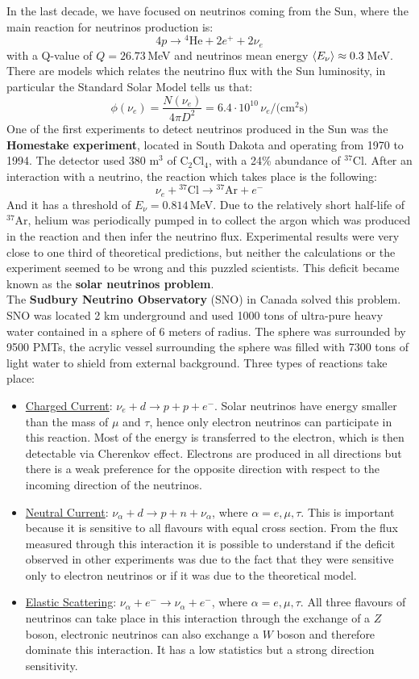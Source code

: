 \documentclass[10.75pt,a4paper,openright,bottom=2cm]{article}
\begin{document}
In the last decade, we have focused on neutrinos coming from the Sun, where the main reaction for neutrinos production is:
\[
4p\to\text{$^4$He}+2e^++2\nu_e
\]
with a Q-value of $Q=26.73$\,MeV and neutrinos mean energy $\Braket{E_\nu}\approx0.3$\,MeV. There are models which relates the neutrino flux with the Sun luminosity, in particular the Standard Solar Model tells us that:
\[
\phi(\nu_e)=\frac{N(\nu_e)}{4\pi D^2}=6.4\cdot10^{10}\,\nu_e/\text{(cm$^2$s)}
\]
One of the first experiments to detect neutrinos produced in the Sun was the \textbf{Homestake experiment}, located in South Dakota and operating from 1970 to 1994. The detector used 380 m$^3$ of C$_2$Cl$_4$, with a 24\% abundance of $^{37}$Cl. After an interaction with a neutrino, the reaction which takes place is the following:
\[
\nu_e+\text{$^{37}$Cl}\to\text{$^{37}$Ar}+e^-
\]
And it has a threshold of $E_\nu=0.814$\,MeV. Due to the relatively short half-life of $^{37}$Ar, helium was periodically pumped in to collect the argon which was produced in the reaction and then infer the neutrino flux. Experimental results were very close to one third of theoretical predictions, but neither the calculations or the experiment seemed to be wrong and this puzzled scientists. This deficit became known as the \textbf{solar neutrinos problem}.\\
The \textbf{Sudbury Neutrino Observatory} (SNO) in Canada solved this problem. SNO was located 2 km underground and used 1000 tons of ultra-pure heavy water contained in a sphere of 6 meters of radius. The sphere was surrounded by 9500 PMTs, the acrylic vessel surrounding the sphere was filled with 7300 tons of light water to shield from external background. Three types of reactions take place:
\begin{itemize}
    \item \underline{Charged Current}: $\nu_e+d\to p+p+e^-$. Solar neutrinos have energy smaller than the mass of $\mu$ and $\tau$, hence only electron neutrinos can participate in this reaction. Most of the energy is transferred to the electron, which is then detectable via Cherenkov effect. Electrons are produced in all directions but there is a weak preference for the opposite direction with respect to the incoming direction of the neutrinos.
    \item \underline{Neutral Current}: $\nu_\alpha+d\to p+n+\nu_\alpha$, where $\alpha=e,\mu,\tau$. This is important because it is sensitive to all flavours with equal cross section. From the flux measured through this interaction it is possible to understand if the deficit observed in other experiments was due to the fact that they were sensitive only to electron neutrinos or if it was due to the theoretical model.
    \item \underline{Elastic Scattering}: $\nu_\alpha+e^-\to\nu_\alpha+e^-$, where $\alpha=e,\mu,\tau$. All three flavours of neutrinos can take place in this interaction through the exchange of a $Z$ boson, electronic neutrinos can also exchange a $W$ boson and therefore dominate this interaction. It has a low statistics but a strong direction sensitivity. 
\end{itemize}
\end{document}
